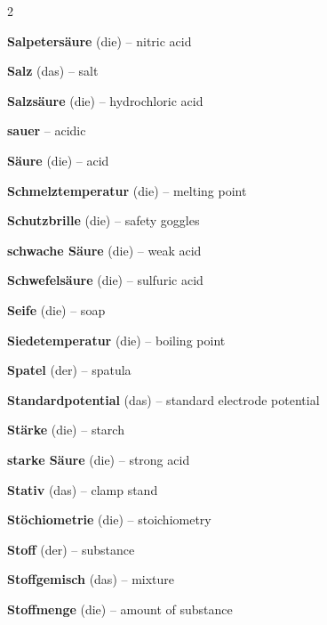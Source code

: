 \begin{multicols}{2}
\par\nopagebreak
\textbf{Salpetersäure} (die) -- nitric acid\dotfill\hyperref[e:180]{\pageref*{e:180}}\par
\textbf{Salz} (das) -- salt\dotfill\hyperref[e:167]{\pageref*{e:167}}\par
\textbf{Salzsäure} (die) -- hydrochloric acid\dotfill\hyperref[e:178]{\pageref*{e:178}}\par
\textbf{sauer} -- acidic\dotfill\hyperref[e:155]{\pageref*{e:155}}\par
\textbf{Säure} (die) -- acid\dotfill\hyperref[e:152]{\pageref*{e:152}}\par
\textbf{Schmelztemperatur} (die) -- melting point\dotfill\hyperref[e:25]{\pageref*{e:25}}\par
\textbf{Schutzbrille} (die) -- safety goggles\dotfill\hyperref[e:62]{\pageref*{e:62}}\par
\textbf{schwache Säure} (die) -- weak acid\dotfill\hyperref[e:169]{\pageref*{e:169}}\par
\textbf{Schwefelsäure} (die) -- sulfuric acid\dotfill\hyperref[e:179]{\pageref*{e:179}}\par
\textbf{Seife} (die) -- soap\dotfill\hyperref[e:245]{\pageref*{e:245}}\par
\textbf{Siedetemperatur} (die) -- boiling point\dotfill\hyperref[e:26]{\pageref*{e:26}}\par
\textbf{Spatel} (der) -- spatula\dotfill\hyperref[e:52]{\pageref*{e:52}}\par
\textbf{Standardpotential} (das) -- standard electrode potential\dotfill\hyperref[e:202]{\pageref*{e:202}}\par
\textbf{Stärke} (die) -- starch\dotfill\hyperref[e:243]{\pageref*{e:243}}\par
\textbf{starke Säure} (die) -- strong acid\dotfill\hyperref[e:168]{\pageref*{e:168}}\par
\textbf{Stativ} (das) -- clamp stand\dotfill\hyperref[e:56]{\pageref*{e:56}}\par
\textbf{Stöchiometrie} (die) -- stoichiometry\dotfill\hyperref[e:258]{\pageref*{e:258}}\par
\textbf{Stoff} (der) -- substance\dotfill\hyperref[e:1]{\pageref*{e:1}}\par
\textbf{Stoffgemisch} (das) -- mixture\dotfill\hyperref[e:5]{\pageref*{e:5}}\par
\textbf{Stoffmenge} (die) -- amount of substance\dotfill\hyperref[e:248]{\pageref*{e:248}}\par

\end{multicols}
